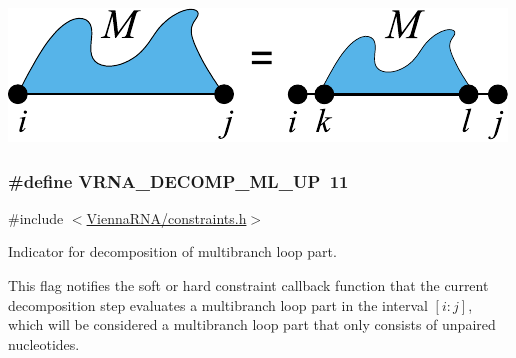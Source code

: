  
\begin{DoxyImageNoCaption}
  \mbox{\includegraphics[width=\textwidth,height=\textheight/2,keepaspectratio=true]{decomp_ml_ml}}
\end{DoxyImageNoCaption}
 \hypertarget{group__constraints_gae6478dda14e50e2f2cb9ef333a29256e}{}
\subsubsection[{V\+R\+N\+A\+\_\+\+D\+E\+C\+O\+M\+P\+\_\+\+M\+L\+\_\+\+U\+P}]{\setlength{\rightskip}{0pt plus 5cm}\#define V\+R\+N\+A\+\_\+\+D\+E\+C\+O\+M\+P\+\_\+\+M\+L\+\_\+\+U\+P~11}\label{group__constraints_gae6478dda14e50e2f2cb9ef333a29256e}


{\ttfamily \#include $<$\hyperlink{constraints_8h}{Vienna\+R\+N\+A/constraints.\+h}$>$}



Indicator for decomposition of multibranch loop part. 

This flag notifies the soft or hard constraint callback function that the current decomposition step evaluates a multibranch loop part in the interval $[i:j]$, which will be considered a multibranch loop part that only consists of unpaired nucleotides.

